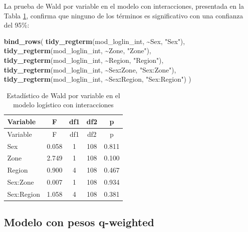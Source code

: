 \documentclass[
  spanish,
  12pt,
]{book}
\newenvironment{Shaded}{\begin{snugshade}}{\end{snugshade}}
\newcommand{\FunctionTok}[1]{\textcolor[rgb]{0.13,0.29,0.53}{\textbf{#1}}}
\newcommand{\NormalTok}[1]{#1}
\newcommand{\SpecialCharTok}[1]{\textcolor[rgb]{0.81,0.36,0.00}{\textbf{#1}}}
\newcommand{\StringTok}[1]{\textcolor[rgb]{0.31,0.60,0.02}{#1}}
\begin{document}
La prueba de Wald por variable en el modelo con interacciones, presentada en la Tabla \ref{tab:tab-wald-interaccion}, confirma que ninguno de los términos es significativo con una confianza del 95\%:

\begin{Shaded}
\begin{Highlighting}[]
\FunctionTok{bind\_rows}\NormalTok{(}
  \FunctionTok{tidy\_regterm}\NormalTok{(mod\_loglin\_int, }\SpecialCharTok{\textasciitilde{}}\NormalTok{Sex,        }\StringTok{"Sex"}\NormalTok{),}
  \FunctionTok{tidy\_regterm}\NormalTok{(mod\_loglin\_int, }\SpecialCharTok{\textasciitilde{}}\NormalTok{Zone,       }\StringTok{"Zone"}\NormalTok{),}
  \FunctionTok{tidy\_regterm}\NormalTok{(mod\_loglin\_int, }\SpecialCharTok{\textasciitilde{}}\NormalTok{Region,     }\StringTok{"Region"}\NormalTok{),}
  \FunctionTok{tidy\_regterm}\NormalTok{(mod\_loglin\_int, }\SpecialCharTok{\textasciitilde{}}\NormalTok{Sex}\SpecialCharTok{:}\NormalTok{Zone,   }\StringTok{"Sex:Zone"}\NormalTok{),}
  \FunctionTok{tidy\_regterm}\NormalTok{(mod\_loglin\_int, }\SpecialCharTok{\textasciitilde{}}\NormalTok{Sex}\SpecialCharTok{:}\NormalTok{Region, }\StringTok{"Sex:Region"}\NormalTok{)}
\NormalTok{)}
\end{Highlighting}
\end{Shaded}

\begin{longtable}[]{@{}lcccc@{}}
\caption{\label{tab:tab-wald-interaccion}Estadístico de Wald por variable en el modelo logístico con interacciones}\tabularnewline
\toprule\noalign{}
Variable & F & df1 & df2 & p \\
\midrule\noalign{}
\endfirsthead
\toprule\noalign{}
Variable & F & df1 & df2 & p \\
\midrule\noalign{}
\endhead
\bottomrule\noalign{}
\endlastfoot
Sex & 0.058 & 1 & 108 & 0.811 \\
Zone & 2.749 & 1 & 108 & 0.100 \\
Region & 0.900 & 4 & 108 & 0.467 \\
Sex:Zone & 0.007 & 1 & 108 & 0.934 \\
Sex:Region & 1.058 & 4 & 108 & 0.381 \\
\end{longtable}

\subsection{Modelo con pesos q-weighted}\label{modelo-con-pesos-q-weighted}
\end{document}
